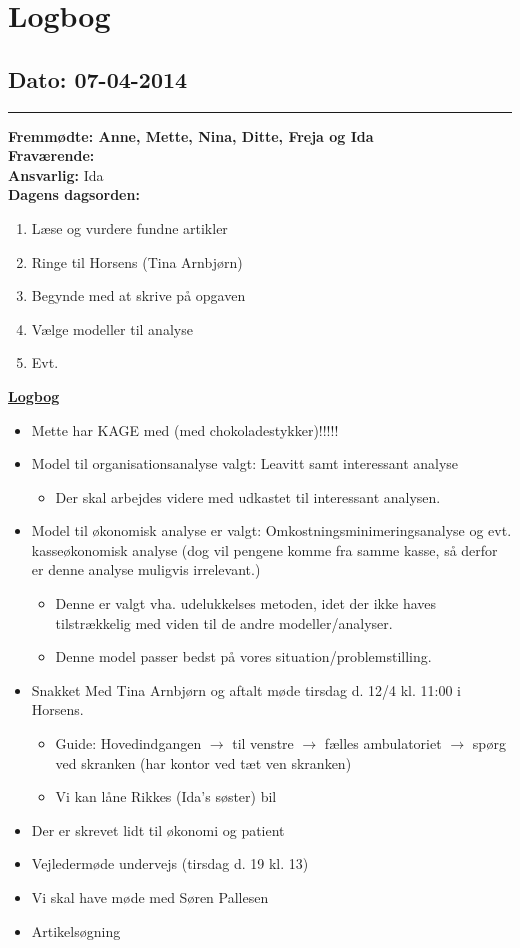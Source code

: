 \chapter{Logbog}
\section{Dato: 07-04-2014}
\hrule
\textbf{Fremmødte: Anne, Mette, Nina, Ditte, Freja og Ida} \\
\textbf{Fraværende: } \\
\textbf{Ansvarlig:} Ida  \\
\textbf{Dagens dagsorden: }
\begin{enumerate}
	\item Læse og vurdere fundne artikler
	\item Ringe til Horsens (Tina Arnbjørn)
	\item Begynde med at skrive på opgaven
	\item Vælge modeller til analyse
	\item Evt. 
\end{enumerate}

\underline{\textbf{Logbog}}
\begin{itemize}
\item Mette har KAGE med (med chokoladestykker)!!!!! 
\item Model til organisationsanalyse valgt: Leavitt samt interessant analyse
\begin{itemize}
\item Der skal arbejdes videre med udkastet til interessant analysen.
\end{itemize}
\item Model til økonomisk analyse er valgt: Omkostningsminimeringsanalyse og evt. kasseøkonomisk analyse (dog vil pengene komme fra samme kasse, så derfor er denne analyse muligvis irrelevant.)
\begin{itemize}
\item Denne er valgt vha. udelukkelses metoden, idet der ikke haves tilstrækkelig med viden til de andre modeller/analyser.
\item Denne model passer bedst på vores situation/problemstilling.
\end{itemize}
\item Snakket Med Tina Arnbjørn og aftalt møde tirsdag d. 12/4 kl. 11:00 i Horsens.
\begin{itemize}
\item Guide: Hovedindgangen $\rightarrow$ til venstre $\rightarrow$ fælles ambulatoriet $\rightarrow$ spørg ved skranken (har kontor ved tæt ven skranken)
\item Vi kan låne Rikkes (Ida's søster) bil
\end{itemize}
\item Der er skrevet lidt til økonomi og patient
\item Vejledermøde undervejs (tirsdag d. 19 kl. 13)
\item Vi skal have møde med Søren Pallesen
\item Artikelsøgning
\end{itemize}
\newpage